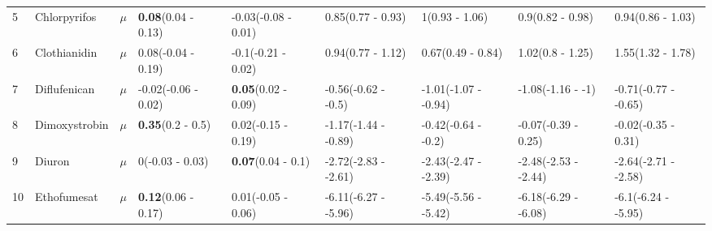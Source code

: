 \begin{longtable}{lp{2cm}p{0.6cm}p{1.8cm}p{1.8cm}p{1.8cm}p{1.8cm}p{1.8cm}p{1.8cm}}
  5 & Chlorpyrifos & $\mu$ & \textbf{0.08}\newline (0.04 - 0.13) & -0.03\newline (-0.08 - 0.01) & 0.85\newline (0.77 - 0.93) & 1\newline (0.93 - 1.06) & 0.9\newline (0.82 - 0.98) & 0.94\newline (0.86 - 1.03) \\ 
  6 & Clothianidin & $\mu$ & 0.08\newline (-0.04 - 0.19) & -0.1\newline (-0.21 - 0.02) & 0.94\newline (0.77 - 1.12) & 0.67\newline (0.49 - 0.84) & 1.02\newline (0.8 - 1.25) & 1.55\newline (1.32 - 1.78) \\ 
  7 & Diflufenican & $\mu$ & -0.02\newline (-0.06 - 0.02) & \textbf{0.05}\newline (0.02 - 0.09) & -0.56\newline (-0.62 - -0.5) & -1.01\newline (-1.07 - -0.94) & -1.08\newline (-1.16 - -1) & -0.71\newline (-0.77 - -0.65) \\ 
  8 & Dimoxystrobin & $\mu$ & \textbf{0.35}\newline (0.2 - 0.5) & 0.02\newline (-0.15 - 0.19) & -1.17\newline (-1.44 - -0.89) & -0.42\newline (-0.64 - -0.2) & -0.07\newline (-0.39 - 0.25) & -0.02\newline (-0.35 - 0.31) \\ 
  9 & Diuron & $\mu$ & 0\newline (-0.03 - 0.03) & \textbf{0.07}\newline (0.04 - 0.1) & -2.72\newline (-2.83 - -2.61) & -2.43\newline (-2.47 - -2.39) & -2.48\newline (-2.53 - -2.44) & -2.64\newline (-2.71 - -2.58) \\ 
  10 & Ethofumesat & $\mu$ & \textbf{0.12}\newline (0.06 - 0.17) & 0.01\newline (-0.05 - 0.06) & -6.11\newline (-6.27 - -5.96) & -5.49\newline (-5.56 - -5.42) & -6.18\newline (-6.29 - -6.08) & -6.1\newline (-6.24 - -5.95) \\ 

\end{longtable}
